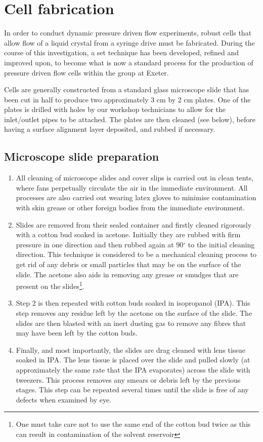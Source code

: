 \section{Cell fabrication}
\label{sec:cell_fabrication}
In order to conduct dynamic pressure driven flow experiments, robust cells that allow flow of a liquid crystal from a syringe drive must be fabricated. During the course of this investigation, a set technique has been developed, refined and improved upon, to become what is now a standard process for the production of pressure driven flow cells within the group at Exeter.

Cells are generally constructed from a standard glass microscope slide that has been cut in half to produce two approximately 3 cm by 2 cm plates. One of the plates is drilled with holes by our workshop technicians to allow for the inlet/outlet pipes to be attached. The plates are then cleaned (see below), before having a surface alignment layer deposited, and rubbed if necessary.

\subsection{Microscope slide preparation}
\begin{enumerate}
\item 
All cleaning of microscope slides and cover slips is carried out in clean tents, where fans perpetually circulate the air in the immediate environment. All processes are also carried out wearing latex gloves to minimise contamination with skin grease or other foreign bodies from the immediate environment.
\item 
Slides are removed from their sealed container and firstly cleaned rigorously with a cotton bud soaked in acetone. Initially they are rubbed with firm pressure in one direction and then rubbed again at 90$^{\circ}$ to the initial cleaning direction. This technique is considered to be a mechanical cleaning process to get rid of any debris or small particles that may be on the surface of the slide. The acetone also aids in removing any grease or smudges that are present on the slides\footnote{One must take care not to use the same end of the cotton bud twice as this can result in contamination of the solvent reservoir}.
\item 
Step 2 is then repeated with cotton buds soaked in isopropanol (IPA). This step removes any residue left by the acetone on the surface of the slide. The slides are then blasted with an inert dusting gas to remove any fibres that may have been left by the cotton buds.
\item 
Finally, and most importantly, the slides are drag cleaned with lens tissue soaked in IPA. The lens tissue is placed over the slide and pulled slowly (at approximately the same rate that the IPA evaporates) across the slide with tweezers. This process removes any smears or debris left by the previous stages. This step can be repeated several times until the slide is free of any defects when examined by eye.
\end{enumerate}

